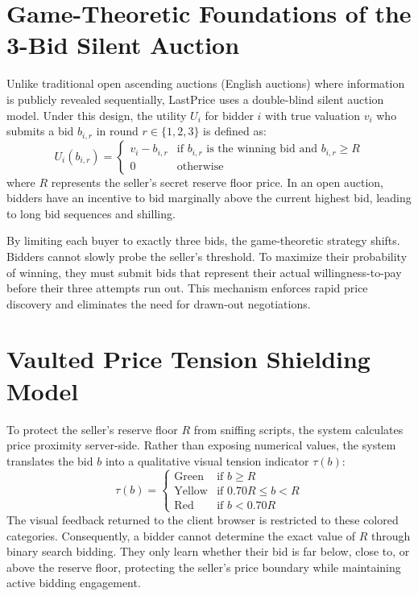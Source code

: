 \documentclass[12pt,a4paper,oneside]{report}
\begin{document}
\section{Game-Theoretic Foundations of the 3-Bid Silent Auction}
Unlike traditional open ascending auctions (English auctions) where information is publicly revealed sequentially, LastPrice uses a double-blind silent auction model. Under this design, the utility $U_i$ for bidder $i$ with true valuation $v_i$ who submits a bid $b_{i,r}$ in round $r \in \{1, 2, 3\}$ is defined as:
\begin{equation}
U_i(b_{i,r}) = \begin{cases} 
v_i - b_{i,r} & \text{if } b_{i,r} \text{ is the winning bid and } b_{i,r} \ge R \\
0 & \text{otherwise}
\end{cases}
\end{equation}
where $R$ represents the seller's secret reserve floor price. In an open auction, bidders have an incentive to bid marginally above the current highest bid, leading to long bid sequences and shilling. 

By limiting each buyer to exactly three bids, the game-theoretic strategy shifts. Bidders cannot slowly probe the seller's threshold. To maximize their probability of winning, they must submit bids that represent their actual willingness-to-pay before their three attempts run out. This mechanism enforces rapid price discovery and eliminates the need for drawn-out negotiations.

\section{Vaulted Price Tension Shielding Model}
To protect the seller's reserve floor $R$ from sniffing scripts, the system calculates price proximity server-side. Rather than exposing numerical values, the system translates the bid $b$ into a qualitative visual tension indicator $\tau(b)$:
\begin{equation}
\tau(b) = \begin{cases} 
\text{Green} & \text{if } b \ge R \\
\text{Yellow} & \text{if } 0.70R \le b < R \\
\text{Red} & \text{if } b < 0.70R
\end{cases}
\end{equation}
The visual feedback returned to the client browser is restricted to these colored categories. Consequently, a bidder cannot determine the exact value of $R$ through binary search bidding. They only learn whether their bid is far below, close to, or above the reserve floor, protecting the seller's price boundary while maintaining active bidding engagement.
\end{document}
